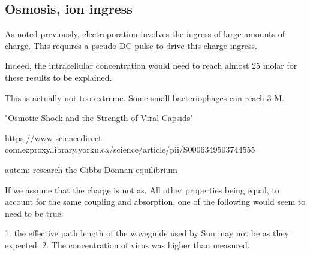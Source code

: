 \documentclass[paper.tex]{subfiles}
\begin{document}
\subsection{Osmosis, ion ingress}

As noted previously, electroporation involves the ingress of large amounts of charge. This requires a pseudo-DC pulse to drive this charge ingress.



Indeed, the intracellular concentration would need to reach almost 25 molar for these results to be explained.

This is actually not too extreme. Some small bacteriophages can reach 3 M.

"Osmotic Shock and the Strength of Viral Capsids"

https://www-sciencedirect-com.ezproxy.library.yorku.ca/science/article/pii/S0006349503744555



\begin{autem}
	autem: research the Gibbs-Donnan equilibrium
\end{autem}









If we assume that the charge is not as. All other properties being equal, to account for the same coupling and absorption, one of the following would seem to need to be true:

1. the effective path length of the waveguide used by Sun may not be as they expected.
2. The concentration of virus was higher than measured.
\end{document}
